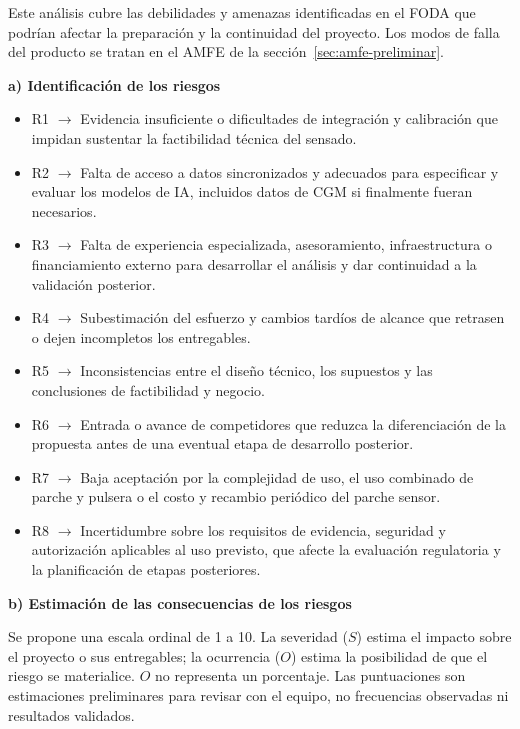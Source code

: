 Este análisis cubre las debilidades y amenazas identificadas en el FODA que podrían afectar la preparación y la continuidad del proyecto. Los modos de falla del producto se tratan en el AMFE de la sección~\ref{sec:amfe-preliminar}.

\noindent\textbf{a) Identificación de los riesgos}
\begin{itemize}
    \item R1 $\rightarrow$ Evidencia insuficiente o dificultades de integración y calibración que impidan sustentar la factibilidad técnica del sensado.
    \item R2 $\rightarrow$ Falta de acceso a datos sincronizados y adecuados para especificar y evaluar los modelos de IA, incluidos datos de CGM si finalmente fueran necesarios.
    \item R3 $\rightarrow$ Falta de experiencia especializada, asesoramiento, infraestructura o financiamiento externo para desarrollar el análisis y dar continuidad a la validación posterior.
    \item R4 $\rightarrow$ Subestimación del esfuerzo y cambios tardíos de alcance que retrasen o dejen incompletos los entregables.
    \item R5 $\rightarrow$ Inconsistencias entre el diseño técnico, los supuestos y las conclusiones de factibilidad y negocio.
    \item R6 $\rightarrow$ Entrada o avance de competidores que reduzca la diferenciación de la propuesta antes de una eventual etapa de desarrollo posterior.
    \item R7 $\rightarrow$ Baja aceptación por la complejidad de uso, el uso combinado de parche y pulsera o el costo y recambio periódico del parche sensor.
    \item R8 $\rightarrow$ Incertidumbre sobre los requisitos de evidencia, seguridad y autorización aplicables al uso previsto, que afecte la evaluación regulatoria y la planificación de etapas posteriores.
\end{itemize}

\noindent\textbf{b) Estimación de las consecuencias de los riesgos}

Se propone una escala ordinal de 1 a 10. La severidad ($S$) estima el impacto sobre el proyecto o sus entregables; la ocurrencia ($O$) estima la posibilidad de que el riesgo se materialice. $O$ no representa un porcentaje. Las puntuaciones son estimaciones preliminares para revisar con el equipo, no frecuencias observadas ni resultados validados.


